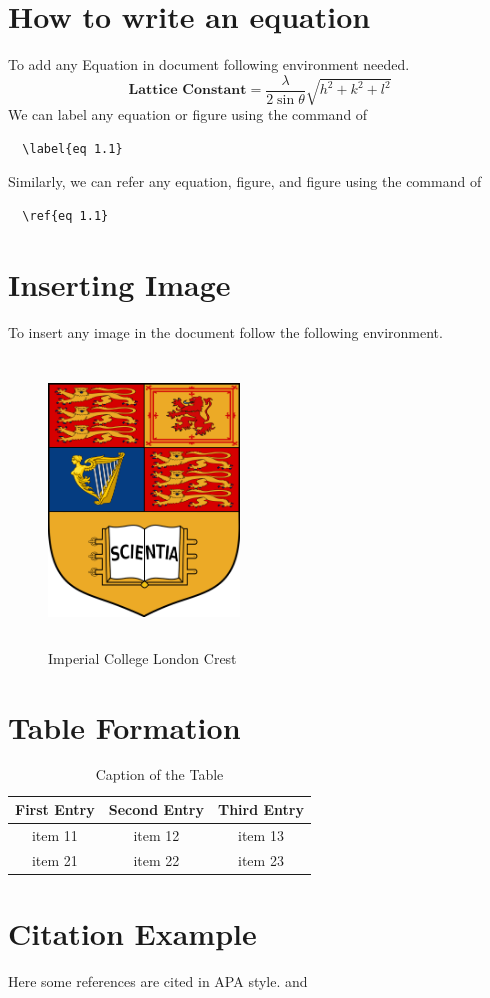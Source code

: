 \section{How to write an equation}
To add any Equation in document following environment needed.
\begin{equation}
    \textbf{Lattice Constant} =\frac{\lambda}{2\sin{\theta}}\sqrt{h^2+k^2+l^2}
    \label{eq 1.1}
\end{equation}
We can label any equation or figure using the command of  \begin{verbatim}
  \label{eq 1.1}
\end{verbatim}
Similarly, we can refer any equation, figure, and figure using the command of\begin{verbatim}
  \ref{eq 1.1}
\end{verbatim}


\section{Inserting Image}
To insert any image in the document follow the following environment.
\begin{figure}[hbt!]
    \centering
    \includegraphics[width=2in,height=3in]{images/cover/icl_crest}
    \caption{Imperial College London Crest}
    \label{fig:my_label}
\end{figure}


\section{Table Formation}
\begin{table}[hbt!]
    \centering
    \caption{Caption of the Table}
    \begin{tabular}{ccc}
        \hline
        First Entry & Second Entry & Third Entry \\
        \hline
        item 11     & item 12      & item 13     \\
        item 21     & item 22      & item 23     \\
        \hline
    \end{tabular}
    \label{tab 1.1}
\end{table}


\section{Citation Example}
\hspace{4em}
Here some references are cited in APA style. \cite{vellacheri2014high} and \cite{asaithambi2021synthesis}
